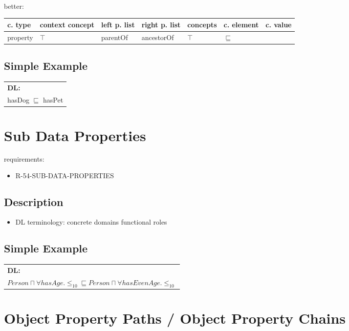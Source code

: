 \documentclass{llncs}
\newenvironment{gcotable}{
  \scriptsize
  \sffamily
  \vspace{0.3cm}
  \begin{tabular}{l|l|l|l|l|l|l}
  \hline
  \textbf{c. type} & \textbf{context concept} & \textbf{left p. list} & \textbf{right p. list} & \textbf{concepts} & \textbf{c. element} & \textbf{c. value} \\
  \hline

}{
  \hline
  \end{tabular}
  \linebreak
}
\newenvironment{DL}{
  \scriptsize
  \sffamily
  \vspace{0.3cm}
  \begin{tabular}{l}
	\textbf{DL:} \\

}{
  \end{tabular}
  \linebreak
}
\begin{document}
better:

\begin{gcotable}
property & $\top$ & parentOf & ancestorOf & $\top$ & $\sqsubseteq$ \\
\end{gcotable}



\subsection{Simple Example}

\begin{DL}
hasDog $\sqsubseteq$ hasPet 
\end{DL}


\section{Sub Data Properties}

requirements:

\begin{itemize}

	\item R-54-SUB-DATA-PROPERTIES
\end{itemize}

\subsection{Description}

\begin{itemize}
	\item DL terminology: concrete domains functional roles  
\end{itemize}

\subsection{Simple Example}
\begin{DL}
 $Person \sqcap  \forall hasAge. \leq_{10} \sqsubseteq Person \sqcap \forall hasEvenAge. \leq_{10}$ 
\end{DL}

\section{Object Property Paths / Object Property Chains}
\end{document}
